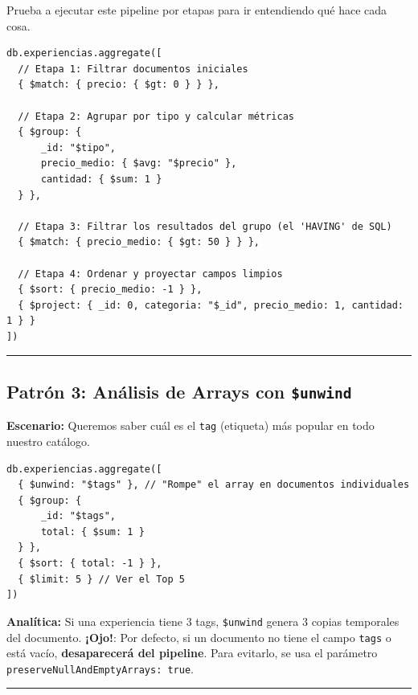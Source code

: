 \documentclass[12pt,a4paper]{article}
\begin{document}
Prueba a ejecutar este pipeline por etapas para ir entendiendo qué hace cada cosa.

\begin{tcolorbox}[title=Pipeline Complejo]
\begin{lstlisting}
db.experiencias.aggregate([
  // Etapa 1: Filtrar documentos iniciales
  { $match: { precio: { $gt: 0 } } },
  
  // Etapa 2: Agrupar por tipo y calcular métricas
  { $group: { 
      _id: "$tipo", 
      precio_medio: { $avg: "$precio" },
      cantidad: { $sum: 1 }
  } },
  
  // Etapa 3: Filtrar los resultados del grupo (el 'HAVING' de SQL)
  { $match: { precio_medio: { $gt: 50 } } },
  
  // Etapa 4: Ordenar y proyectar campos limpios
  { $sort: { precio_medio: -1 } },
  { $project: { _id: 0, categoria: "$_id", precio_medio: 1, cantidad: 1 } }
])
\end{lstlisting}
\end{tcolorbox}

\begin{center}\rule{0.5\linewidth}{0.5pt}\end{center}

\subsection{Patrón 3: Análisis de Arrays con \texttt{\$unwind}}\label{unwind}
\textbf{Escenario:} Queremos saber cuál es el \texttt{tag} (etiqueta) más popular en todo nuestro catálogo.

\begin{tcolorbox}[title=Contar elementos dentro de arrays]
\begin{lstlisting}
db.experiencias.aggregate([
  { $unwind: "$tags" }, // "Rompe" el array en documentos individuales
  { $group: { 
      _id: "$tags", 
      total: { $sum: 1 } 
  } },
  { $sort: { total: -1 } },
  { $limit: 5 } // Ver el Top 5
])
\end{lstlisting}
\end{tcolorbox}

\textbf{Analítica:} Si una experiencia tiene 3 tags, \texttt{\$unwind} genera 3 copias temporales del documento. \textbf{¡Ojo!}: Por defecto, si un documento no tiene el campo \texttt{tags} o está vacío, \textbf{desaparecerá del pipeline}. Para evitarlo, se usa el parámetro \texttt{preserveNullAndEmptyArrays: true}.

\begin{center}\rule{0.5\linewidth}{0.5pt}\end{center}
\end{document}
